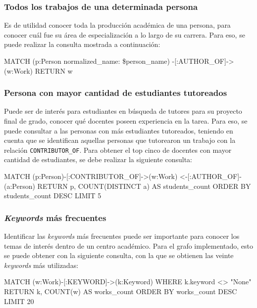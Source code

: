 \documentclass[journal]{IEEEtran}
\begin{document}
\subsubsection{Todos los trabajos de una determinada persona}
Es de utilidad conocer toda la producción académica de una persona, para conocer cuál fue su área de especialización a lo largo de su carrera. Para eso, se puede realizar la consulta mostrada a continuación:

\begin{sflisting}[style=sparql,caption= Obtener los trabajos de una persona,label=trabajos_persona]
	MATCH (p:Person {normalized_name: \$person_name})
	-[:AUTHOR_OF]->(w:Work)
	RETURN w
\end{sflisting}

\subsubsection{Persona con mayor cantidad de estudiantes tutoreados}
Puede ser de interés para estudiantes en búsqueda de tutores para su proyecto final de grado, conocer qué docentes poseen experiencia en la tarea. Para eso, se puede consultar a las personas con más estudiantes tutoreados, teniendo en cuenta que se identifican aquellas personas que tutorearon un trabajo con la relación \texttt{CONTRIBUTOR\_OF}. Para obtener el top cinco de docentes con mayor cantidad de estudiantes, se debe realizar la siguiente consulta:

\begin{sflisting}[style=sparql,caption= Docentes con mayor cantidad de estudiantes tutoreados,label=docentes_con_mas_estudiantes]
	MATCH (p:Person)-[:CONTRIBUTOR_OF]->(w:Work)
	<-[:AUTHOR_OF]-(a:Person)
	RETURN p, COUNT(DISTINCT a) AS students_count
	ORDER BY students_count DESC
	LIMIT 5
\end{sflisting}

\subsubsection{\textit{Keywords} más frecuentes}
Identificar las \textit{keywords} más frecuentes puede ser importante para conocer los temas de interés dentro de un centro académico. Para el grafo implementado, esto se puede obtener con la siguiente consulta, con la que se obtienen las veinte \textit{keywords} más utilizadas:

\begin{sflisting}[style=sparql,caption= \textit{Keywords} más frecuentes,label=keywords]
	MATCH (w:Work)-[:KEYWORD]->(k:Keyword)
	WHERE k.keyword <> "None"
	RETURN k, COUNT(w) AS works_count
	ORDER BY works_count DESC
	LIMIT 20
\end{sflisting}
\end{document}
